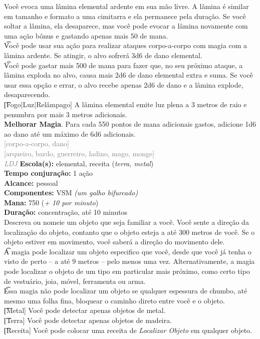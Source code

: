 \documentclass{RPG_Adventure}[2021/10/20]
\begin{document}
{\normalsize Você evoca uma lâmina elemental ardente em sua mão livre. A lâmina é similar em tamanho e formato a uma cimitarra e ela permanece pela duração. Se você soltar a lâmina, ela desaparece, mas você pode evocar a lâmina novamente com uma ação bônus e gastando apenas mais 50 de mana.\\\t Você pode usar sua ação para realizar ataques corpo-a-corpo com magia com a lâmina ardente. Se atingir, o alvo sofrerá 3d6 de dano elemental.\\\t Você pode gastar mais 500 de mana para fazer que, no seu próximo ataque, a lâmina exploda no alvo, causa mais 2d6 de dano elemental extra e suma. Se você usar essa opção e errar, o alvo recebe apenas 2d6 de dano e a lâmina explode, desaparecendo.\\\t [Fogo|Luz|Relâmpago] A lâmina elemental emite luz plena a 3 metros de raio e penumbra por mais 3 metros adicionais.\\\t \textbf{Melhorar Magia}. Para cada 550 pontos de mana adicionais gastos, adicione 1d6 ao dano até um máximo de 6d6 adicionais.\\}
{\scriptsize \textcolor{gray}{[corpo-a-corpo, dano]\\}}
{\scriptsize \textcolor{gray}{[arqueiro, bardo, guerreiro, ladino, mago, monge]\\}}
{\tiny \textcolor{gray}{\textit{LDJ}}}\jump{}
{\small \t \textbf{Escola(s):} elemental, receita (\textit{terra, metal})\\\t \textbf{Tempo conjuração:} 1 ação\\\t \textbf{Alcance:} pessoal\\\t \textbf{Componentes:} VSM \textit{(um galho bifurcado)}\\\t \textbf{Mana:} 750 (\textit{+ 10 por minuto})\\\t \textbf{Duração:} concentração, até 10 minutos\\}
{\normalsize Descreva ou nomeie um objeto que seja familiar a você. Você sente a direção da localização do objeto, contanto que o objeto esteja a até 300 metros de você. Se o objeto estiver em movimento, você saberá a direção do movimento dele.\\\t A magia pode localizar um objeto especifico que você, desde que você já tenha o visto de perto – a até 9 metros – pelo menos uma vez. Alternativamente, a magia pode localizar o objeto de um tipo em particular mais próximo, como certo tipo de vestuário, joia, móvel, ferramenta ou arma.\\\t Essa magia não pode localizar um objeto se qualquer espessura de chumbo, até mesmo uma folha fina, bloquear o caminho direto entre você e o objeto.\\\t [Metal] Você pode detectar apenas objetos de metal.\\\t [Terra] Você pode detectar apenas objetos de madeira.\\\t [Receita] Você pode colocar uma receita de \textit{Localizar Objeto} em qualquer objeto.\\}
\end{document}
